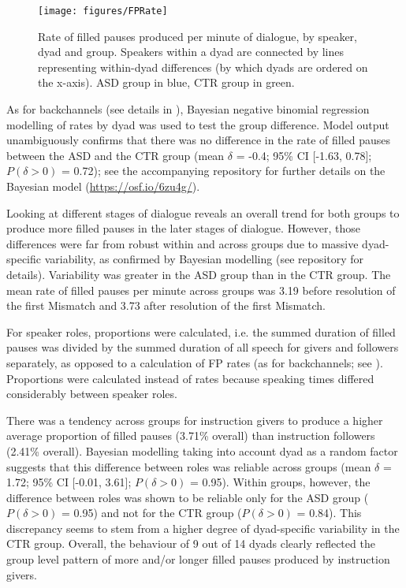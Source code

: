 \begin{figure}
	
	{\texttt{[image: figures/FPRate]}
		
	}
	
	\caption{Rate of filled pauses produced per minute of dialogue, by speaker, dyad and group. Speakers within a dyad are connected by lines representing within-dyad differences (by which dyads are ordered on the x-axis). ASD group in blue, CTR group in green.}\label{fig:FPRate}
\end{figure}

As for backchannels (see details in ), Bayesian negative binomial regression modelling of rates by dyad was used to test the group difference. Model output unambiguously confirms that there was no difference in the rate of filled pauses between the ASD and the CTR group (mean \(\delta\) = -0.4; 95\% CI {[}-1.63, 0.78{]}; \(P(\delta > 0)\) = 0.72); see the accompanying repository for further details on the Bayesian model (\url{https://osf.io/6zu4g/}).

Looking at different stages of dialogue reveals an overall trend for both groups to produce more filled pauses in the later stages of dialogue. However, those differences were far from robust within and across groups due to massive dyad-specific variability, as confirmed by Bayesian modelling (see repository for details). Variability was greater in the ASD group than in the CTR group. The mean rate of filled pauses per minute across groups was 3.19 before resolution of the first Mismatch and 3.73 after resolution of the first Mismatch.

For speaker roles, proportions were calculated, i.e. the summed duration of filled pauses was divided by the summed duration of all speech for givers and followers separately, as opposed to a calculation of FP rates (as for backchannels; see ). Proportions were calculated instead of rates because speaking times differed considerably between speaker roles.

There was a tendency across groups for instruction givers to produce a higher average proportion of filled pauses (3.71\% overall) than instruction followers (2.41\% overall). Bayesian modelling taking into account dyad as a random factor suggests that this difference between roles was reliable across groups (mean \(\delta\) = 1.72; 95\% CI {[}-0.01, 3.61{]}; \(P(\delta > 0)\) = 0.95). Within groups, however, the difference between roles was shown to be reliable only for the ASD group (\(P(\delta > 0)\) = 0.95) and not for the CTR group (\(P(\delta > 0)\) = 0.84). This discrepancy seems to stem from a higher degree of dyad-specific variability in the CTR group. Overall, the behaviour of 9 out of 14 dyads clearly reflected the group level pattern of more and/or longer filled pauses produced by instruction givers.



